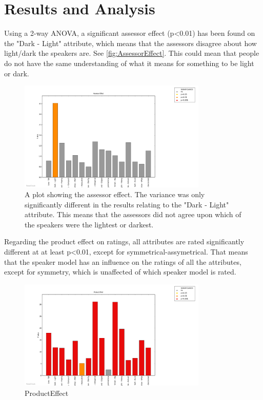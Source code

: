 \section*{Results and Analysis}
\label{Results}


Using a 2-way ANOVA, a significant assessor effect (p<0.01) has been found on the "Dark - Light" attribute, which means that the assessors disagree about how light/dark the speakers are. See \autoref{fig:AssessorEffect}. This could mean that people do not have the same understanding of what it means for something to be light or dark.
\begin{figure}[H]
\centering
\includegraphics[width =0.8\textwidth]{Figure/AssessorEffect.png} 
\caption{A plot showing the assessor effect. The variance was only significantly different in the results relating to the "Dark - Light" attribute. This means that the assessors did not agree upon which of the speakers were the lightest or darkest.}
\label{fig:AssessorEffect}
\end{figure}
Regarding the product effect on ratings, all attributes are rated significantly different at at least p<0.01, except for symmetrical-assymetrical. That means that the speaker model has an influence on the ratings of all the attributes, except for symmetry, which is unaffected of which speaker model is rated.
\begin{figure}[H]
\centering
\includegraphics[width = 0.8\textwidth]{Figure/ProductEffect.png} 
\caption{ProductEffect}
\label{fig:ProductEffect}
\end{figure}

